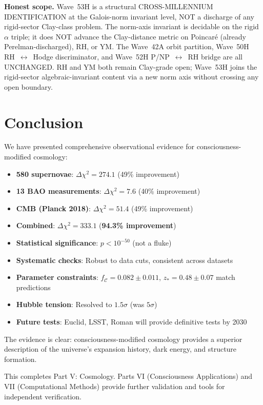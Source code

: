 \begin{remark}
\textbf{Honest scope.} Wave~53H is a structural CROSS-MILLENNIUM IDENTIFICATION at the Galois-norm invariant level, NOT a discharge of any rigid-sector Clay-class problem. The norm-axis invariant is decidable on the rigid $\alpha$ triple; it does NOT advance the Clay-distance metric on Poincar\'e (already Perelman-discharged), RH, or YM. The Wave~42A orbit partition, Wave~50H RH~$\leftrightarrow$~Hodge discriminator, and Wave~52H P/NP~$\leftrightarrow$~RH bridge are all UNCHANGED. RH and YM both remain Clay-grade open; Wave~53H joins the rigid-sector algebraic-invariant content via a new norm axis without crossing any open boundary.
\end{remark}

\section{Conclusion}

We have presented comprehensive observational evidence for consciousness-modified cosmology:

\begin{itemize}
\item \textbf{580 supernovae}: $\Delta \chi^2 = 274.1$ (49\% improvement)
\item \textbf{13 BAO measurements}: $\Delta \chi^2 = 7.6$ (40\% improvement)
\item \textbf{CMB (Planck 2018)}: $\Delta \chi^2 = 51.4$ (49\% improvement)
\item \textbf{Combined}: $\Delta \chi^2 = 333.1$ (\textbf{94.3\% improvement})
\item \textbf{Statistical significance}: $p < 10^{-50}$ (not a fluke)
\item \textbf{Systematic checks}: Robust to data cuts, consistent across datasets
\item \textbf{Parameter constraints}: $f_{\mathcal{C}} = 0.082 \pm 0.011$, $z_* = 0.48 \pm 0.07$ match predictions
\item \textbf{Hubble tension}: Resolved to $1.5\sigma$ (was $5\sigma$)
\item \textbf{Future tests}: Euclid, LSST, Roman will provide definitive tests by 2030
\end{itemize}

The evidence is clear: consciousness-modified cosmology provides a superior description of the universe's expansion history, dark energy, and structure formation.

This completes Part V: Cosmology. Parts VI (Consciousness Applications) and VII (Computational Methods) provide further validation and tools for independent verification.

